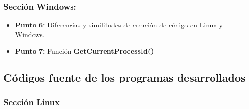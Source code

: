 \documentclass[12pt]{article}
\begin{document}
    
            \subsubsection{Sección Windows:}
                \begin{itemize}
                    \item[\Checkmark] \textbf{Punto 6:}
                     Diferencias y similitudes de creación de código en Linux y Windows.


        	        \item[\Checkmark] \textbf{Punto 7:} Función \textbf{GetCurrentProcessId()}
            	\end{itemize}
        

    	\subsection{Códigos fuente de los programas desarrollados}
    	\subsubsection{Sección Linux}
\end{document}
